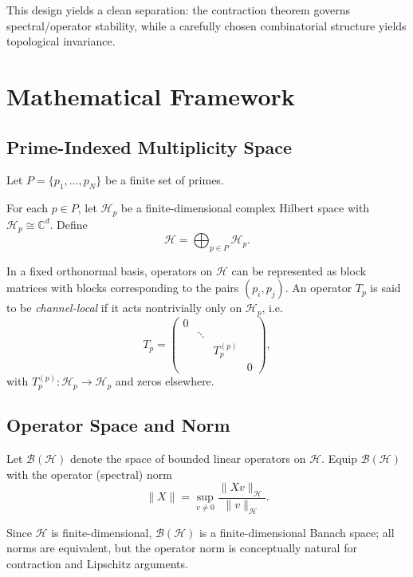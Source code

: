 \documentclass[12pt]{article}
\begin{document}
This design yields a clean separation: the contraction theorem governs spectral/operator stability, while a carefully chosen combinatorial structure yields topological invariance.

\newpage

\section{Mathematical Framework}

\subsection{Prime-Indexed Multiplicity Space}

Let \(P=\{p_1,\dots,p_N\}\) be a finite set of primes.

For each \(p\in P\), let \(\mathcal{H}_p\) be a finite-dimensional complex Hilbert space with \(\mathcal{H}_p \cong \mathbb{C}^d\). Define
\[
  \mathcal{H} = \bigoplus_{p\in P} \mathcal{H}_p.
\]

In a fixed orthonormal basis, operators on \(\mathcal{H}\) can be represented as block matrices with blocks corresponding to the pairs \((p_i,p_j)\). An operator \(T_p\) is said to be \emph{channel-local} if it acts nontrivially only on \(\mathcal{H}_p\), i.e.
\[
  T_p = \begin{pmatrix}
    0 &        &        &   \\
      & \ddots &        &   \\
      &        & T_p^{(p)} & \\
      &        &        & 0
  \end{pmatrix},
\]
with \(T_p^{(p)}:\mathcal{H}_p\to\mathcal{H}_p\) and zeros elsewhere.

\subsection{Operator Space and Norm}

Let \(\mathcal{B}(\mathcal{H})\) denote the space of bounded linear operators on \(\mathcal{H}\). Equip \(\mathcal{B}(\mathcal{H})\) with the operator (spectral) norm
\[
  \|X\| = \sup_{v \neq 0} \frac{\|Xv\|_{\mathcal{H}}}{\|v\|_{\mathcal{H}}}.
\]

Since \(\mathcal{H}\) is finite-dimensional, \(\mathcal{B}(\mathcal{H})\) is a finite-dimensional Banach space; all norms are equivalent, but the operator norm is conceptually natural for contraction and Lipschitz arguments.
\end{document}
